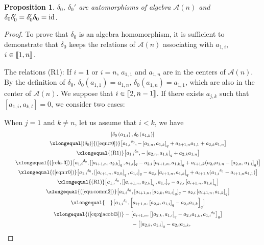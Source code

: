\documentclass[pdftex]{sigma}
\numberwithin{equation}{section}
\def\id{{\rm id}}
\def\lr#1{\left[#1\right]}
\def\lrb#1{\left(#1\right)}
\def\d{\delta}
\def\A{\mathscr{A}}
\def\lbb#1{\left[\kern-0.15em\left[ {#1} \right] \kern-0.15em\right]}
\newtheorem{Proposition}[Theorem]{Proposition}
 { \theoremstyle{definition}
\newtheorem{Definition}[Theorem]{Definition}
\newtheorem{Note}[Theorem]{Note}
\newtheorem{Example}[Theorem]{Example}
\newtheorem{Remark}[Theorem]{Remark} }
\begin{document}
\begin{Proposition}
$\d_0$, $\d_0' $ are automorphisms of algebra $\A(n)$ and $\d_0\d_0'=\d_0'\d_0=\id$.
\end{Proposition}
\begin{proof}
To prove that $\d_0$ is an algebra homomorphism, it is sufficient to demonstrate that $\d_0$ keeps the relations of $\A(n)$ associating with $a_{1,i}$, $i \in \lbb{1, n}.$

The relations (R1):
If $i=1$ or $i=n$, $a_{1,1}$ and $a_{1,n}$ are in the centers of $\A(n)$.
By the definition of $\d_0$, $\d_0(a_{1,1})=a_{1,n}$, $\d_0(a_{1,n})=a_{1,1}$, which are also in the center of $\A(n)$.
We suppose that $i \in \lbb{2,n-1}$.
If there exists $a_{j,k}$ such that $[a_{1,i}, a_{k,l}]=0$, we consider two cases:

When $j=1$ and $ k\neq n$, let us assume that $i<k$, we have
\begin{gather*}
 \lr{\d_0\lrb{a_{1,i}},\d_0\lrb{a_{1,k}}}\\
\qquad \xlongequal[(\d_0)]{\lrb{\ref{eqn:r0}}} \bigl[{a_{1,i}}^{\d_0}, -\lr{a_{2,n}, a_{1,k}}_q+a_{k+1,n}a_{1,1}+a_{2,k}a_{1,n}\bigr]\\
\qquad\xlongequal{\lrb{\textrm{R1}}} \bigl[{a_{1,i}}^{\d_0}, -\lr{a_{2,n}, a_{1,k}}_q+a_{2,k}a_{1,n}\bigr]\\
\qquad \xlongequal{\lrb{\ref{rela-3}}} \bigl[{a_{1,i}}^{\d_0}, [\lr{a_{i+1, n}, a_{2, k}}_q, a_{1, i}]_q -a_{2, i}\lr{a_{i+1, n}, a_{1, k}}_q +a_{i+1, k}(a_{2, i} a_{1, n}-\lr{ a_{2, n}, a_{1, i}}_q)\bigr]\\
\qquad \xlongequal{\lrb{\ref{eqn:r0}}} \bigl[{a_{1,i}}^{\d_0}, [\lr{a_{i+1, n}, a_{2, k}}_q, a_{1, i}]_q -a_{2, i}\lr{a_{i+1, n}, a_{1, k}}_q +a_{i+1, k}({a_{1,i}}^{\d_0}-a_{i+1,n}a_{1,1})\bigr]\\
\qquad \xlongequal{\lrb{\textrm{R1}}} \bigl[{a_{1,i}}^{\d_0}, [\lr{a_{i+1, n}, a_{2, k}}_q, a_{1, i}]_q -a_{2, i}\lr{a_{i+1, n}, a_{1, k}}_q \bigr]\\
\qquad \xlongequal{\lrb{\ref{equ:comm2}}} \bigl[{a_{1,i}}^{\d_0}, [a_{i+1, n}, \lr{a_{2, k}, a_{1, i}}_q]_q -a_{2, i}\lr{a_{i+1, n}, a_{1, k}}_q \bigr]\\
 \qquad\xlongequal{\quad} \bigl[{a_{1,i}}^{\d_0}, \lr{a_{i+1, n}, \lr{a_{2, k}, a_{1, i}}_q-a_{2, i}a_{1, k}}_q \bigr]\\
\qquad \xlongequal{\lrb{\ref{eq:qjacobi3}}} -\bigl[a_{i+1, n}, \bigl[\lr{a_{2, k}, a_{1, i}}_q -a_{2, i}a_{1, k}, {a_{1,i}}^{\d_0} \bigr]_q \bigr] \\
\phantom{\qquad \xlongequal{\qquad}\!\! }{} - \bigl[\lr{a_{2, k}, a_{1, i}}_q-a_{2, i}a_{1, k},

\end{gather*}
\end{proof}
\end{document}
